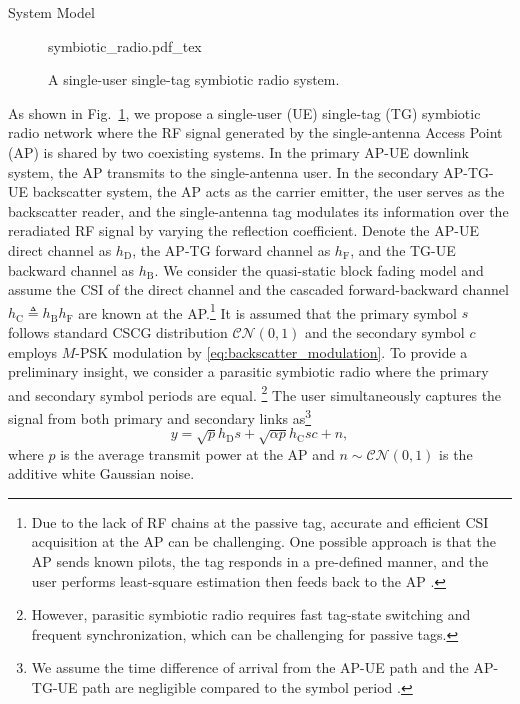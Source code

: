 \documentclass[journal]{IEEEtran}
\begin{document}
	\begin{section}{System Model}
		\begin{figure}[!t]
			\centering
			\def\svgwidth{0.9\columnwidth}
			{symbiotic_radio.pdf_tex}
			\caption{A single-user single-tag symbiotic radio system.}
			\label{fi:symbiotic_radio}
		\end{figure}
		As shown in Fig.~\ref{fi:symbiotic_radio}, we propose a single-user (UE) single-tag (TG) symbiotic radio network where the RF signal generated by the single-antenna Access Point (AP) is shared by two coexisting systems. In the primary AP-UE downlink system, the AP transmits to the single-antenna user. In the secondary AP-TG-UE backscatter system, the AP acts as the carrier emitter, the user serves as the backscatter reader, and the single-antenna tag modulates its information over the reradiated RF signal by varying the reflection coefficient. Denote the AP-UE direct channel as $h_{\mathrm{D}}$, the AP-TG forward channel as $h_{\mathrm{F}}$, and the TG-UE backward channel as $h_{\mathrm{B}}$. We consider the quasi-static block fading model and assume the CSI of the direct channel and the cascaded forward-backward channel $h_{\mathrm{C}} \triangleq h_{\mathrm{B}} h_{\mathrm{F}}$ are known at the AP.\footnote{Due to the lack of RF chains at the passive tag, accurate and efficient CSI acquisition at the AP can be challenging. One possible approach is that the AP sends known pilots, the tag responds in a pre-defined manner, and the user performs least-square estimation then feeds back to the AP \cite{Bharadia2015,Yang2015b,Guo2019e}.} It is assumed that the primary symbol $s$ follows standard CSCG distribution $\mathcal{CN}(0,1)$ and the secondary symbol $c$ employs $M$-PSK modulation by \eqref{eq:backscatter_modulation}. To provide a preliminary insight, we consider a parasitic symbiotic radio \cite{Long2020a} where the primary and secondary symbol periods are equal. \footnote{However, parasitic symbiotic radio requires fast tag-state switching and frequent synchronization, which can be challenging for passive tags.} The user simultaneously captures the signal from both primary and secondary links as\footnote{We assume the time difference of arrival from the AP-UE path and the AP-TG-UE path are negligible compared to the symbol period \cite{Guo2019b,Liang2020,Long2020a}.}
		\begin{equation}
			y = \sqrt{p} h_{\mathrm{D}} s + \sqrt{\alpha p} h_{\mathrm{C}} s c + n,
		\end{equation}
		where $p$ is the average transmit power at the AP and $n \sim \mathcal{CN}(0,1)$ is the additive white Gaussian noise.


\end{section}
\end{document}

